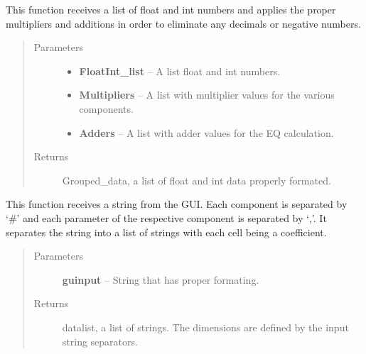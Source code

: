 \documentclass[letterpaper,10pt,english]{sphinxmanual}
\begin{document}
\begin{fulllineitems}
\label{Code:DataStrLeon.data4intformator}
This function receives a list of float and int numbers and applies the proper multipliers and
additions in order to eliminate any decimals or negative numbers.
\begin{quote}\begin{description}
\item[{Parameters}] \leavevmode\begin{itemize}
\item {} 
\textbf{FloatInt\_list} -- A list float and int numbers.

\item {} 
\textbf{Multipliers} -- A list with multiplier values for the various components.

\item {} 
\textbf{Adders} -- A list with adder values for the EQ calculation.

\end{itemize}

\item[{Returns}] \leavevmode
Grouped\_data, a list of float and int data properly formated.

\end{description}\end{quote}

\end{fulllineitems}


\begin{fulllineitems}
\label{Code:DataStrLeon.guiparse}
This function receives a string from the GUI. Each component is separated by `\#' and each parameter
of the respective component is separated by `,'.
It separates the string into a list of strings with each cell being a coefficient.
\begin{quote}\begin{description}
\item[{Parameters}] \leavevmode
\textbf{guinput} -- String that has proper formating.

\item[{Returns}] \leavevmode
datalist, a list of strings. The dimensions are defined by the input string separators.

\end{description}\end{quote}

\end{fulllineitems}
\end{document}
